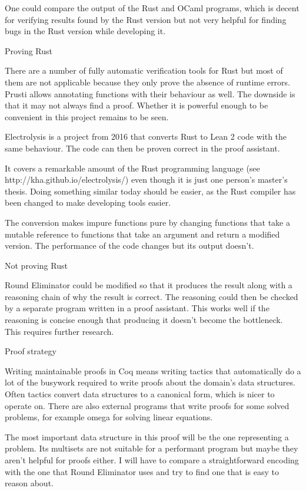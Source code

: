 \documentclass{article}
\begin{document}
One could compare the output of the Rust and OCaml programs, which is decent for verifying results found by the Rust version but not very helpful for finding bugs in the Rust version while developing it.

Proving Rust

There are a number of fully automatic verification tools for Rust but most of them are not applicable because they only prove the absence of runtime errors. Prusti allows annotating functions with their behaviour as well. The downside is that it may not always find a proof. Whether it is powerful enough to be convenient in this project remains to be seen.

Electrolysis is a project from 2016 that converts Rust to Lean 2 code with the same behaviour. The code can then be proven correct in the proof assistant.

It covers a remarkable amount of the Rust programming language (see http://kha.github.io/electrolysis/) even though it is just one person's master's thesis. Doing something similar today should be easier, as the Rust compiler has been changed to make developing tools easier.

The conversion makes impure functions pure by changing functions that take a mutable reference to functions that take an argument and return a modified version. The performance of the code changes but its output doesn't.

Not proving Rust

Round Eliminator could be modified so that it produces the result along with a reasoning chain of why the result is correct. The reasoning could then be checked by a separate program written in a proof assistant. This works well if the reasoning is concise enough that producing it doesn't become the bottleneck. This requires further research.

Proof strategy

Writing maintainable proofs in Coq means writing tactics that automatically do a lot of the busywork required to write proofs about the domain's data structures. Often tactics convert data structures to a canonical form, which is nicer to operate on. There are also external programs that write proofs for some solved problems, for example omega for solving linear equations.

The most important data structure in this proof will be the one representing a problem. Its multisets are not suitable for a performant program but maybe they aren't helpful for proofs either. I will have to compare a straightforward encoding with the one that Round Eliminator uses and try to find one that is easy to reason about.
\end{document}
